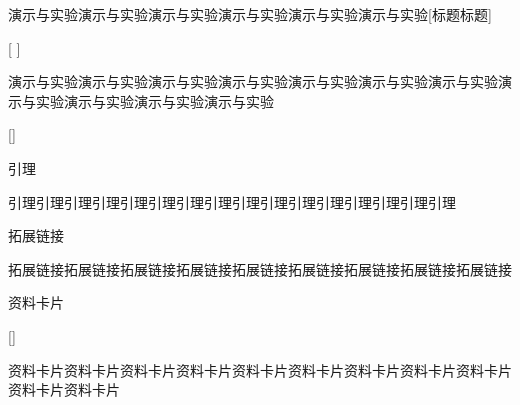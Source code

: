 \documentclass[color=blue]{textbook-cn}%
\begin{document}
\begin{Project}
\begin{box2}{演示与实验演示与实验演示与实验演示与实验演示与实验演示与实验}[标题标题]
	\lipsum[2]
\end{box2}


\begin{box2}{ }[ ]
	\lipsum[2]
\end{box2}


\newpage
\begin{box3}{演示与实验演示与实验演示与实验演示与实验演示与实验演示与实验演示与实验演示与实验演示与实验演示与实验演示与实验}
	\lipsum[2]
\end{box3}


\begin{box3}{ }[]
	\lipsum[2][1-3]
\end{box3}





\begin{box4}{引理}
\lipsum[2]
\end{box4}

\begin{box4}{引理引理引理引理引理引理引理引理引理引理引理引理引理引理引理引理}
\lipsum[2]
\end{box4}



\begin{box5}{拓展链接}
\lipsum[2]
\end{box5}

\begin{box5}{拓展链接拓展链接拓展链接拓展链接拓展链接拓展链接拓展链接拓展链接拓展链接}
	\lipsum[2]
	\lipsum[2]
\end{box5}



\begin{box6}{资料卡片}
	\lipsum[2]
\end{box6}



\begin{box6}{ }[]
	\lipsum[2][1-3]
\end{box6}


\begin{box6}{资料卡片资料卡片资料卡片资料卡片资料卡片资料卡片资料卡片资料卡片资料卡片资料卡片资料卡片}
	\lipsum[2]
\end{box6}


\begin{Information}
	\lipsum[2]
	\lipsum[2]
\end{Information}





\end{Project}
\end{document}
